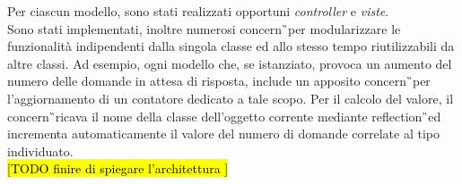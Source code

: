 Per ciascun modello, sono stati realizzati opportuni \textit{controller} e \textit{viste}. \\
Sono stati implementati, inoltre numerosi \gls{concern}\G\ per modularizzare le funzionalità indipendenti dalla singola classe ed allo stesso tempo riutilizzabili da altre classi. Ad esempio, ogni modello che, se istanziato, provoca un aumento del numero delle domande in attesa di risposta, include un apposito \gls{concern}\G\ per l'aggiornamento di un contatore dedicato a tale scopo. Per il calcolo del valore, il \gls{concern}\G\ ricava il nome della classe dell'oggetto corrente mediante \gls{reflection}\G\ ed incrementa automaticamente il valore del numero di domande correlate al tipo individuato.\\
\hl{[TODO finire di spiegare l'architettura ]}\\




